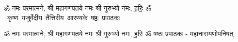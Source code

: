 \documentclass[17pt]{extarticle}
\begin{document}
\begin{titlepage}
    \begin{center}
 
\begin{sanskrit}
    { \Large
    ॐ नमः परमात्मने, श्री महागणपतये नमः
श्री गुरुभ्यो नमः, ह॒रिः॒ ॐ 
    }
    \\
    \vspace{2.5cm}
    \mbox{ \Huge
    कृष्ण यजुर्वेदीय तैत्तिरीय आरण्यके षष्ठः प्रपाठकः   }
\end{sanskrit}
\end{center}

\end{titlepage}
\tableofcontents

ॐ नमः परमात्मने, श्री महागणपतये नमः
श्री गुरुभ्यो नमः, ह॒रिः॒ ॐ      षष्ठः प्रपाठकः - महानारायणोपनिषत् \newline

\end{document}
